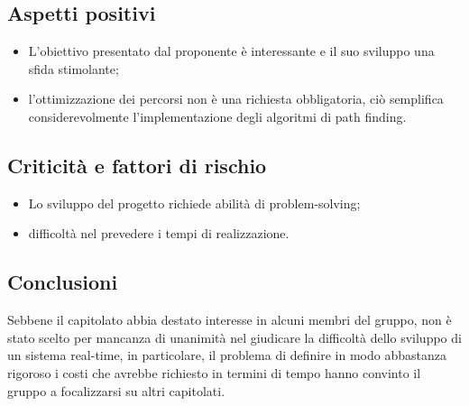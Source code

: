 \subsection{Aspetti positivi}
\begin{itemize}
	\item L'obiettivo presentato dal proponente è interessante e il suo sviluppo una sfida stimolante;
    \item l'ottimizzazione dei percorsi non è una richiesta obbligatoria, ciò semplifica considerevolmente l'implementazione degli algoritmi di path finding. 
\end{itemize}
\subsection{Criticità e fattori di rischio}
\begin{itemize}
    \item Lo sviluppo del progetto richiede abilità di problem-solving;
	\item difficoltà nel prevedere i tempi di realizzazione.
\end{itemize}
\subsection{Conclusioni}
Sebbene il capitolato abbia destato interesse in alcuni membri del gruppo, non è stato scelto per mancanza di unanimità nel giudicare la difficoltà dello sviluppo di un sistema real-time, in particolare, il problema di definire in modo abbastanza rigoroso i costi che avrebbe richiesto in termini di tempo hanno convinto il gruppo a focalizzarsi su altri capitolati. 
